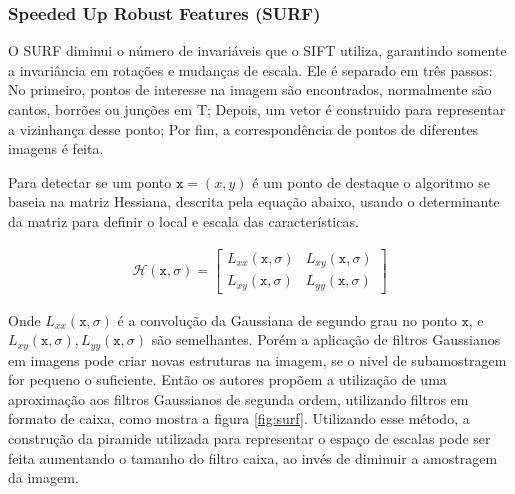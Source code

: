 \subsubsection{Speeded Up Robust Features (SURF)}

  O SURF diminui o número de invariáveis que o SIFT utiliza, garantindo somente a invariância em rotações e mudanças de 
escala. Ele é separado em três passos: No primeiro, pontos de interesse na imagem são encontrados, normalmente são cantos,
borrões ou junções em T; Depois, um vetor é construido para representar a vizinhança desse ponto; Por fim, a 
correspondência de pontos de diferentes imagens é feita.

  Para detectar se um ponto $\mathtt{x} = (x, y)$ é um ponto de destaque o algoritmo se baseia na matriz Hessiana, 
descrita pela equação abaixo, usando o determinante da matriz para definir o local e escala das características.

\begin{align}\label{eq:hessian}
    \mathcal{H}(\mathtt{x}, \sigma) = 
      \begin{bmatrix} 
        L_{xx}(\mathtt{x}, \sigma) & L_{xy}(\mathtt{x}, \sigma) \\
        L_{xy}(\mathtt{x}, \sigma) & L_{yy}(\mathtt{x}, \sigma)
      \end{bmatrix}
\end{align}

  Onde $L_{xx}(\mathtt{x}, \sigma)$ é a convolução da Gaussiana de segundo grau no ponto $\mathtt{x}$, e  
$L_{xy}(\mathtt{x}, \sigma), L_{yy}(\mathtt{x}, \sigma)$ são semelhantes. Porém a aplicação de filtros Gaussianos em
imagens pode criar novas estruturas na imagem, se o nivel de subamostragem for pequeno o suficiente. Então os autores 
propõem a utilização de uma aproximação aos filtros Gaussianos de segunda ordem, utilizando filtros em formato de caixa,
como mostra a figura \ref{fig:surf}. Utilizando esse método, a construção da piramide utilizada para representar o 
espaço de escalas pode ser feita aumentando o tamanho do filtro caixa, ao invés de diminuir a amostragem da imagem.

